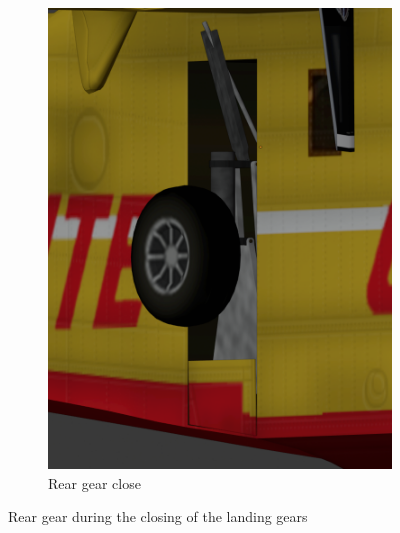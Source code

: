 \documentclass{article}
\begin{document}
\begin{figure}[h!]
\begin{subfigure}[h!]{0.4\linewidth}
    \includegraphics[width=\linewidth]{postclose.png}
    \caption{Rear gear close}
  \end{subfigure}
  \caption{Rear gear during the closing of the landing gears}
\end{figure}
\end{document}
